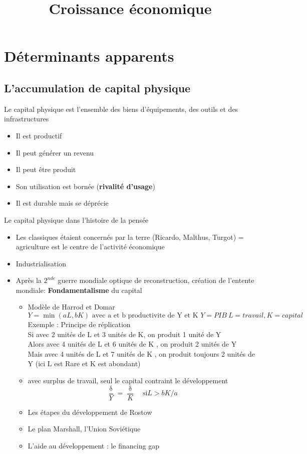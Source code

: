 \documentclass{article}
\title{Croissance économique}
\begin{document}
\maketitle
\tableofcontents
\newpage
\section{Déterminants apparents}

\subsection{L'accumulation de capital physique}
Le capital physique est l'ensemble des biens d'équipements, des outils et des infrastructures
\begin{itemize}
	\item Il est productif
	\item Il peut générer un revenu
	\item Il peut être produit
	\item Son utilisation est bornée (\textbf{rivalité d'usage})
	\item Il est durable mais se déprécie	
\end{itemize}
Le capital physique dans l'histoire de la pensée
\begin{itemize}
	\item Les classiques étaient concernés par la terre (Ricardo, Malthus, Turgot) = agriculture est le centre de l'activité économique
	\item Industrialisation
	\item Après la \(2^{nde}\) guerre mondiale optique de reconstruction, création de l'entente mondiale: \textbf{Fondamentalisme} du capital
	\begin{itemize}
		\item Modèle de Harrod et Domar
		 \[ Y = \min (aL , bK)		   \textrm{ avec a et b productivite de Y et K } Y = PIB\  L = travail, K = capital\]
		Exemple : Principe de réplication \\
		Si avec 2 unités de L et 3 unités de K, on produit 1 unité de Y\\
		Alors avec 4 unités de L et 6 unités de K , on produit 2 unités de Y\\
		Mais avec 4 unités de L et 7 unités de K , on produit toujours 2 unités de Y (ici L est Rare et K est abondant)\\
		
		\item avec surplus de travail, seul le capital contraint le développement 
		\[ \frac{\updelta}{Y} = \frac{\updelta}{K} \quad \textrm{si} L > bK / a \]
		\item Les étapes du développement de Rostow
		\item Le plan Marshall, l'Union Soviétique
		\item L'aide au développement : le financing gap		
	\end{itemize}
\end{itemize}
\end{document}
